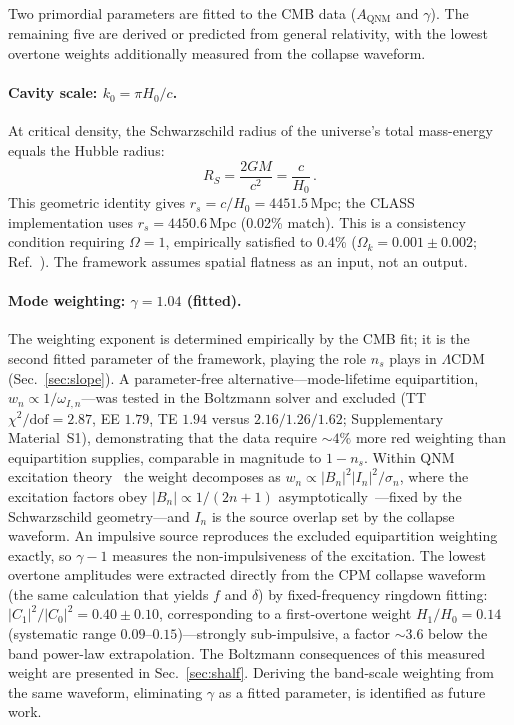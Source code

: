 \documentclass[aps,prd,twocolumn,superscriptaddress,showpacs,preprintnumbers,amsmath,amssymb,nofootinbib]{revtex4-2}
\newcommand{\lcdm}{$\Lambda$CDM}
\newcommand{\Mpc}{\,\mathrm{Mpc}}
\begin{document}
Two primordial parameters are fitted to the CMB data ($A_\mathrm{QNM}$ and $\gamma$). The remaining five are derived or predicted from general relativity, with the lowest overtone weights additionally measured from the collapse waveform.

\paragraph{Cavity scale: $k_0 = \pi H_0/c$.}
At critical density, the Schwarzschild radius of the universe's total mass-energy equals the Hubble radius:
\begin{equation}
\label{eq:rs_identity}
R_S = \frac{2GM}{c^2} = \frac{c}{H_0}\,.
\end{equation}
This geometric identity gives $r_s = c/H_0 = 4451.5\Mpc$; the CLASS implementation uses $r_s = 4450.6\Mpc$ (0.02\% match). This is a consistency condition requiring $\Omega = 1$, empirically satisfied to 0.4\% ($\Omega_k = 0.001 \pm 0.002$; Ref.~\cite{Planck2020}). The framework assumes spatial flatness as an input, not an output.

\paragraph{Mode weighting: $\gamma = 1.04$ (fitted).}
The weighting exponent is determined empirically by the CMB fit; it is the second fitted parameter of the framework, playing the role $n_s$ plays in \lcdm{} (Sec.~\ref{sec:slope}). A parameter-free alternative---mode-lifetime equipartition, $w_n \propto 1/\omega_{I,n}$---was tested in the Boltzmann solver and excluded (TT $\chi^2/\mathrm{dof} = 2.87$, EE $1.79$, TE $1.94$ versus $2.16/1.26/1.62$; Supplementary Material~S1), demonstrating that the data require $\sim 4\%$ more red weighting than equipartition supplies, comparable in magnitude to $1 - n_s$. Within QNM excitation theory~\cite{Leaver1986,BertiCardoso2006} the weight decomposes as $w_n \propto |B_n|^2 |I_n|^2/\sigma_n$, where the excitation factors obey $|B_n| \propto 1/(2n+1)$ asymptotically~\cite{BertiCardoso2006}---fixed by the Schwarzschild geometry---and $I_n$ is the source overlap set by the collapse waveform. An impulsive source reproduces the excluded equipartition weighting exactly, so $\gamma - 1$ measures the non-impulsiveness of the excitation. The lowest overtone amplitudes were extracted directly from the CPM collapse waveform (the same calculation that yields $f$ and $\delta$) by fixed-frequency ringdown fitting: $|C_1|^2/|C_0|^2 = 0.40 \pm 0.10$, corresponding to a first-overtone weight $H_1/H_0 = 0.14$ (systematic range $0.09$--$0.15$)---strongly sub-impulsive, a factor $\sim 3.6$ below the band power-law extrapolation. The Boltzmann consequences of this measured weight are presented in Sec.~\ref{sec:shalf}. Deriving the band-scale weighting from the same waveform, eliminating $\gamma$ as a fitted parameter, is identified as future work.
\end{document}
